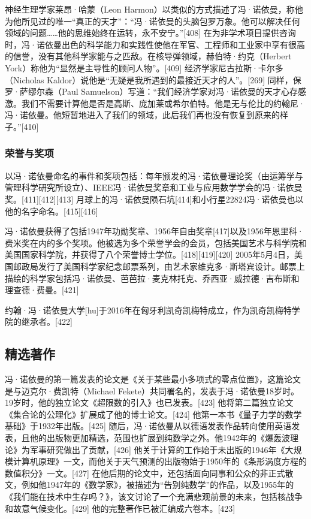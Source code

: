 神经生理学家莱昂·哈蒙（Leon Harmon）以类似的方式描述了冯·诺依曼，称他为他所见过的唯一“真正的天才”：“冯·诺依曼的头脑包罗万象。他可以解决任何领域的问题……他的思维始终在运转，永不安宁。”[408] 在为非学术项目提供咨询时，冯·诺依曼出色的科学能力和实践性使他在军官、工程师和工业家中享有很高的信誉，没有其他科学家能与之匹敌。在核导弹领域，赫伯特·约克（Herbert York）称他为“显然是主导性的顾问人物”。[409] 经济学家尼古拉斯·卡尔多（Nicholas Kaldor）说他是“无疑是我所遇到的最接近天才的人”。[269] 同样，保罗·萨缪尔森（Paul Samuelson）写道：“我们经济学家对冯·诺依曼的天才心存感激。我们不需要计算他是否是高斯、庞加莱或希尔伯特。他是无与伦比的约翰尼·冯·诺依曼。他短暂地进入了我们的领域，此后我们再也没有恢复到原来的样子。”[410]
\subsubsection{荣誉与奖项}
以冯·诺依曼命名的事件和奖项包括：每年颁发的冯·诺依曼理论奖（由运筹学与管理科学研究所设立）、IEEE冯·诺依曼奖章和工业与应用数学学会的冯·诺依曼奖。[411][412][413] 月球上的冯·诺依曼陨石坑[414]和小行星22824冯·诺依曼也以他的名字命名。[415][416]

冯·诺依曼获得了包括1947年功勋奖章、1956年自由奖章[417]以及1956年恩里科·费米奖在内的多个奖项。他被选为多个荣誉学会的会员，包括美国艺术与科学院和美国国家科学院，并获得了八个荣誉博士学位。[418][419][420] 2005年5月4日，美国邮政局发行了美国科学家纪念邮票系列，由艺术家维克多·斯塔宾设计。邮票上描绘的科学家包括冯·诺依曼、芭芭拉·麦克林托克、乔西亚·威拉德·吉布斯和理查德·费曼。[421]

约翰·冯·诺依曼大学[hu]于2016年在匈牙利凯奇凯梅特成立，作为凯奇凯梅特学院的继承者。[422]
\subsection{精选著作}  
冯·诺依曼的第一篇发表的论文是《关于某些最小多项式的零点位置》，这篇论文是与迈克尔·费凯特（Michael Fekete）共同署名的，发表于冯·诺依曼18岁时。19岁时，他的独立论文《超限数的引入》也已发表。[423] 他将第二篇独立论文《集合论的公理化》扩展成了他的博士论文。[424] 他第一本书《量子力学的数学基础》于1932年出版。[425] 随后，冯·诺依曼从以德语发表作品转向使用英语发表，且他的出版物更加精选，范围也扩展到纯数学之外。他1942年的《爆轰波理论》为军事研究做出了贡献，[426] 他关于计算的工作始于未出版的1946年《大规模计算机原理》一文，而他关于天气预测的出版物始于1950年的《条形涡度方程的数值积分》一文。[427] 在他后期的论文中，还包括面向同事和公众的非正式散文，例如他1947年的《数学家》，被描述为“告别纯数学”的作品，以及1955年的《我们能在技术中生存吗？》，该文讨论了一个充满悲观前景的未来，包括核战争和故意气候变化。[429] 他的完整著作已被汇编成六卷本。[423]

